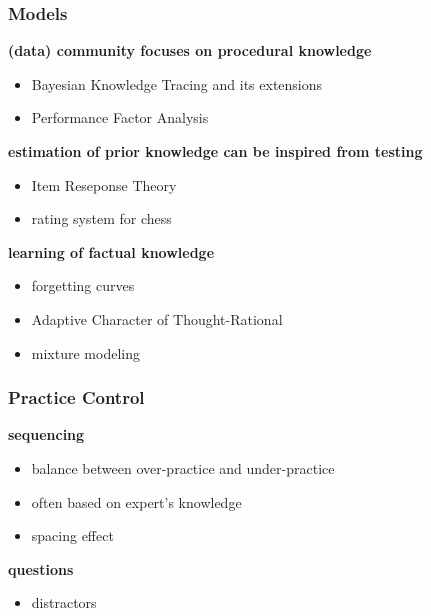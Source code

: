 \documentclass[xcolor=svgnames]{beamer}
\renewcommand{\cite}[1]{{\small\parencite{#1}}}
\begin{document}
\begin{frame}
	\frametitle{Models}
	\textbf{(data) community focuses on procedural knowledge}
	\begin{itemize}
		\item Bayesian Knowledge Tracing and its extensions\\\cite{van2013properties, qiu2011does}
		\item Performance Factor Analysis~\cite{pavlik2009performance}
	\end{itemize}

	\medskip
	\textbf{estimation of prior knowledge can be inspired from testing}
	\begin{itemize}
		\item Item Reseponse Theory~\cite{rasch1993probabilistic,de2008theory}
		\item rating system for chess~\cite{elo1978rating}
	\end{itemize}

	\medskip
	\textbf{learning of factual knowledge}
	\begin{itemize}
		\item forgetting curves~\cite{ebbinghaus1885spacing}
		\item Adaptive Character of Thought-Rational\\\cite{pavlik2005practice}
		\item mixture modeling~\cite{streeter2015mixture}
	\end{itemize}
\end{frame}
\begin{frame}
	\frametitle{Practice Control}
	\textbf{sequencing}
	\begin{itemize}
		\item balance between over-practice and under-practice\\\cite{cen2007over}
		\item often based on expert's knowledge~\cite{lopes2015multi}
		\item spacing effect~\cite{ebbinghaus1885spacing}
	\end{itemize}
	\textbf{questions}
	\begin{itemize}
		\item distractors~\cite{little2015optimizing}
	\end{itemize}
\end{frame}
\end{document}
